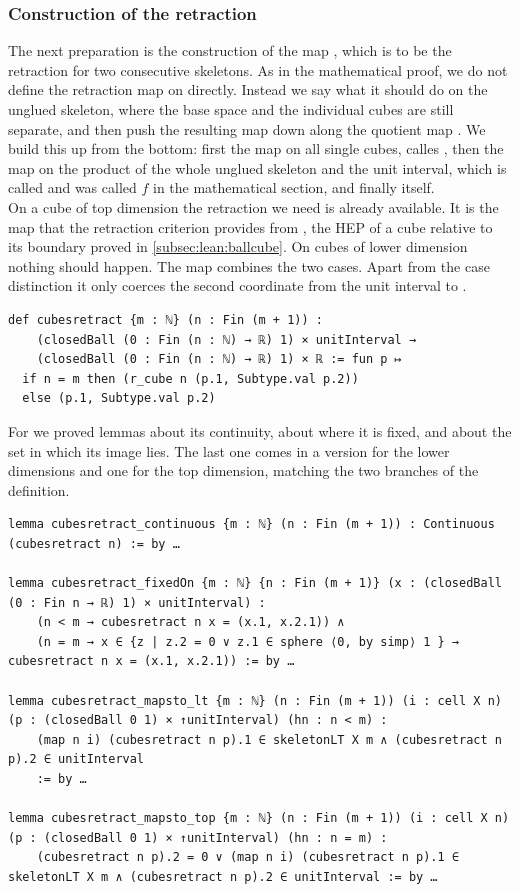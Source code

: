 \documentclass[11pt, a4paper, english]{article}
\theoremstyle{plain}
\theoremstyle{definition}
\theoremstyle{remark}
\numberwithin{equation}{section}
\numberwithin{theorem}{section}
\begin{document}
\subsubsection{Construction of the retraction} \label{subsubsec:lean:skel:constructionretraction}
The next preparation is the construction of the map , which is to be the retraction for two consecutive skeletons. As in the mathematical proof, we do not define the retraction map  on  directly. Instead we say what it should do on the unglued skeleton, where the base space and the individual cubes are still separate, and then push the resulting map down along the quotient map . We build this up from the bottom: first the map on all single cubes, calles , then the map on the product of the whole unglued skeleton and the unit interval, which is called  and was called $f$ in the mathematical section, and finally  itself.\\

On a cube of top dimension the retraction we need is already available. It is the map  that the retraction criterion provides from , the HEP of a cube relative to its boundary proved in \cref{subsec:lean:ballcube}. On cubes of lower dimension nothing should happen. The map  combines the two cases. Apart from the case distinction it only coerces the second coordinate from the unit interval to .
\begin{verbatim}
def cubesretract {m : ℕ} (n : Fin (m + 1)) :
    (closedBall (0 : Fin (n : ℕ) → ℝ) 1) × unitInterval →
    (closedBall (0 : Fin (n : ℕ) → ℝ) 1) × ℝ := fun p ↦
  if n = m then (r_cube n (p.1, Subtype.val p.2))
  else (p.1, Subtype.val p.2)
\end{verbatim}

For  we proved lemmas about its continuity, about where it is fixed, and about the set in which its image lies. The last one comes in a version for the lower dimensions and one for the top dimension, matching the two branches of the definition.

\begin{verbatim}
lemma cubesretract_continuous {m : ℕ} (n : Fin (m + 1)) : Continuous (cubesretract n) := by …

lemma cubesretract_fixedOn {m : ℕ} {n : Fin (m + 1)} (x : (closedBall (0 : Fin n → ℝ) 1) × unitInterval) :
    (n < m → cubesretract n x = (x.1, x.2.1)) ∧
    (n = m → x ∈ {z | z.2 = 0 ∨ z.1 ∈ sphere ⟨0, by simp⟩ 1 } → cubesretract n x = (x.1, x.2.1)) := by …

lemma cubesretract_mapsto_lt {m : ℕ} (n : Fin (m + 1)) (i : cell X n) (p : (closedBall 0 1) × ↑unitInterval) (hn : n < m) :
    (map n i) (cubesretract n p).1 ∈ skeletonLT X m ∧ (cubesretract n p).2 ∈ unitInterval
    := by …
    
lemma cubesretract_mapsto_top {m : ℕ} (n : Fin (m + 1)) (i : cell X n) (p : (closedBall 0 1) × ↑unitInterval) (hn : n = m) :
    (cubesretract n p).2 = 0 ∨ (map n i) (cubesretract n p).1 ∈ skeletonLT X m ∧ (cubesretract n p).2 ∈ unitInterval := by …
\end{verbatim}
\end{document}
